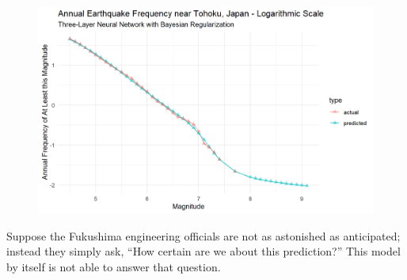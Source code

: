 \begin{figure}[H]
    \center
    \includegraphics[width=0.8\linewidth]{Figures/tohoku_logscale_brnn.png}
    \label{tohoku_brnn}
\end{figure}

Suppose the Fukushima engineering officials are not as astonished as anticipated; instead they simply ask, ``How certain are we about this prediction?''  This model by itself is not able to answer that question. 
